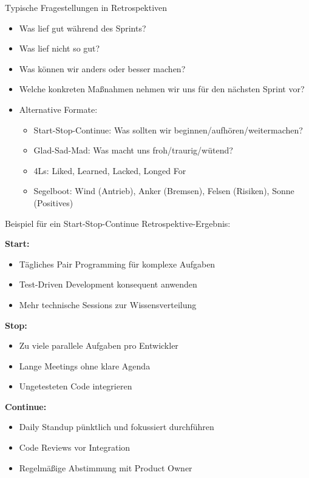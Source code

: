\begin{concept}{Typische Fragestellungen in Retrospektiven}\\
    \begin{itemize}
        \item Was lief gut während des Sprints?
        \item Was lief nicht so gut?
        \item Was können wir anders oder besser machen?
        \item Welche konkreten Maßnahmen nehmen wir uns für den nächsten Sprint vor?
        
        \item Alternative Formate:
        \begin{itemize}
            \item Start-Stop-Continue: Was sollten wir beginnen/aufhören/weitermachen?
            \item Glad-Sad-Mad: Was macht uns froh/traurig/wütend?
            \item 4Ls: Liked, Learned, Lacked, Longed For
            \item Segelboot: Wind (Antrieb), Anker (Bremsen), Felsen (Risiken), Sonne (Positives)
        \end{itemize}
    \end{itemize}
\end{concept}

\begin{example}
    Beispiel für ein Start-Stop-Continue Retrospektive-Ergebnis:
    
    \textbf{Start:}
    \begin{itemize}
        \item Tägliches Pair Programming für komplexe Aufgaben
        \item Test-Driven Development konsequent anwenden
        \item Mehr technische Sessions zur Wissensverteilung
    \end{itemize}
    
    \textbf{Stop:}
    \begin{itemize}
        \item Zu viele parallele Aufgaben pro Entwickler
        \item Lange Meetings ohne klare Agenda
        \item Ungetesteten Code integrieren
    \end{itemize}
    
    \textbf{Continue:}
    \begin{itemize}
        \item Daily Standup pünktlich und fokussiert durchführen
        \item Code Reviews vor Integration
        \item Regelmäßige Abstimmung mit Product Owner
    \end{itemize}
\end{example}

